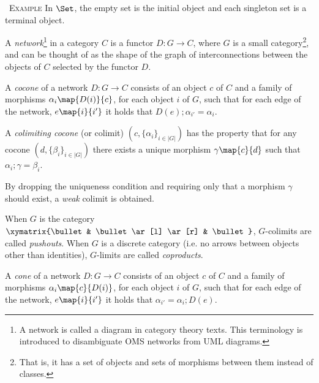 \documentclass[10pt, a4paper]{isov2}
\renewenvironment{example}[0]{\ \newline \textsc{Example}\quad }{}
\begin{document}
\begin{example}
In $\Set$, the empty set is the initial object and each singleton set is a
terminal object.
\end{example}



\label{sec:colimits}

\begin{definition}
A \emph{network}\footnote{A network is called a diagram in category theory texts. This terminology is introduced to disambiguate OMS networks
from UML diagrams.} in a category $C$ is 
a functor $D:G\to C$, where $G$ is a small category\footnote{That is, it has a set of objects and sets of morphisms between them
instead of classes.}, and can be thought of as the shape of the graph of
interconnections between the objects of $C$ selected by the functor $D$. 
\end{definition}

\begin{definition}
A \emph{cocone} of
a network $D:G\to C$ consists of an object $c$ of $C$ and a family of
morphisms $\alpha_i\map{D(i)}{c}$, for each object $i$ of $G$, such that for
each edge of the network, $e\map{i}{i'}$  it holds that 
$D(e);\alpha_{i'} = \alpha_{i}$. 
\end{definition}

\begin{definition}
A \emph{colimiting cocone} (or colimit) $(c, \{\alpha_i\}_{i\in|G|})$ 
has the property that for any 
cocone $(d, \{\beta_i\}_{i\in |G|})$ there exists a unique morphism 
$\gamma\map{c}{d}$ such that $\alpha_i;\gamma = \beta_i$.
 \end{definition}
  By dropping the 
uniqueness condition and requiring only that a morphism $\gamma$ should exist,
 a \emph{weak} colimit is obtained. 

When $G$ is the category $\xymatrix{\bullet & \bullet \ar[l] \ar[r]
& \bullet }$, $G$-colimits are
called  \emph{pushouts}. 
When $G$ is a discrete category (i.e. no arrows between objects other than identities),
 $G$-limits are called \emph{coproducts}.

\begin{definition}
A \emph{cone} of
a network $D:G\to C$ consists of an object $c$ of $C$ and a family of
morphisms $\alpha_i\map{c}{D(i)}$, for each object $i$ of $G$, such that for
each edge of the network, $e\map{i}{i'}$  it holds that 
$\alpha_{i'} = \alpha_{i};D(e)$. 
\end{definition} 
\end{document}
